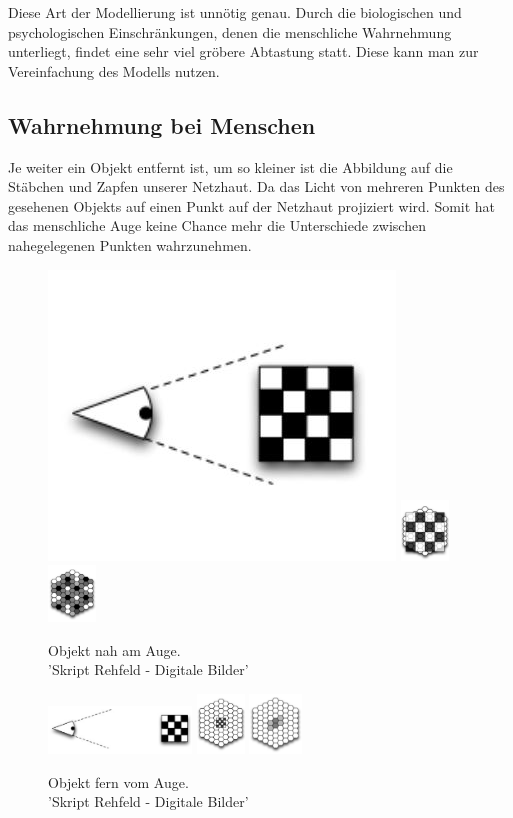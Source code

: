 \documentclass[tog]{acmsiggraph}
\begin{document}
Diese Art der Modellierung ist unnötig genau. Durch die biologischen und psychologischen Einschränkungen, denen die menschliche Wahrnehmung unterliegt, findet eine sehr viel gröbere Abtastung statt. Diese kann man zur Vereinfachung des Modells nutzen.

\subsection{Wahrnehmung bei Menschen}
Je weiter ein Objekt entfernt ist, um so kleiner ist die Abbildung auf die Stäbchen und Zapfen unserer Netzhaut. Da das Licht von mehreren Punkten des gesehenen Objekts auf einen Punkt auf der Netzhaut projiziert wird. Somit hat das menschliche Auge keine Chance mehr die Unterschiede zwischen nahegelegenen Punkten wahrzunehmen.

\begin{figure}[ht]
  \centering
  \includegraphics[width=.75in]{images/AugeObjektNah}
  \includegraphics[width=0.5in]{images/SinneszelleObjektNah}
  \includegraphics[width=0.5in]{images/AbbildungAufSinneszelleObjektNah}
  \caption{Objekt nah am Auge. \\'Skript Rehfeld - Digitale Bilder'}
  \label{fig:Objekt nah am Auge}
\end{figure}

\begin{figure}[ht]
  \centering
  \includegraphics[width=1.5in]{images/AugeObjektFern}
  \includegraphics[width=0.5in]{images/SinneszelleObjektFern}
  \includegraphics[width=0.55in]{images/AbbildungAufSinneszelleObjektFern}
  \caption{Objekt fern vom Auge. \\'Skript Rehfeld - Digitale Bilder'}
  \label{fig:Objekt fern vom Auge}
\end{figure}
\end{document}
